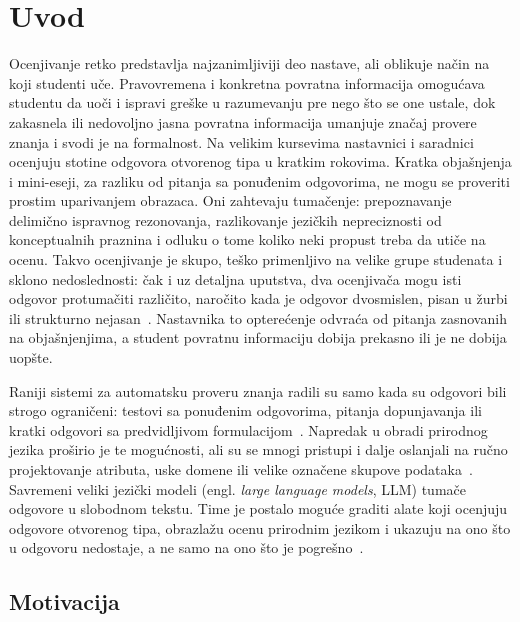 \chapter{Uvod}
\label{sec:uvod}

Ocenjivanje retko predstavlja najzanimljiviji deo nastave, ali oblikuje način na koji studenti uče.
Pravovremena i konkretna povratna informacija omogućava studentu da uoči i ispravi greške u razumevanju pre nego što se one ustale,
dok zakasnela ili nedovoljno jasna povratna informacija umanjuje značaj provere znanja i svodi je na formalnost.
Na velikim kursevima nastavnici i saradnici ocenjuju stotine odgovora otvorenog tipa u kratkim rokovima.
Kratka objašnjenja i mini-eseji, za razliku od pitanja sa ponuđenim odgovorima, ne mogu se proveriti prostim uparivanjem obrazaca.
Oni zahtevaju tumačenje: prepoznavanje delimično ispravnog rezonovanja,
razlikovanje jezičkih nepreciznosti od konceptualnih praznina i odluku o tome koliko neki propust treba da utiče na ocenu.
Takvo ocenjivanje je skupo, teško primenljivo na velike grupe studenata i sklono nedoslednosti:
čak i uz detaljna uputstva, dva ocenjivača mogu isti odgovor protumačiti različito,
naročito kada je odgovor dvosmislen, pisan u žurbi ili strukturno nejasan~\cite{brookhart2016century,jonsson2007use,stemler2004comparison}.
Nastavnika to opterećenje odvraća od pitanja zasnovanih na objašnjenjima,
a student povratnu informaciju dobija prekasno ili je ne dobija uopšte.

Raniji sistemi za automatsku proveru znanja radili su samo kada su odgovori bili strogo ograničeni:
testovi sa ponuđenim odgovorima,
pitanja dopunjavanja ili kratki odgovori sa predvidljivom formulacijom~\cite{brew2013automated,ramesh2022automated,shermis2003automated}.
Napredak u obradi prirodnog jezika proširio je te mogućnosti, ali su se mnogi pristupi i dalje oslanjali na ručno projektovanje atributa,
uske domene ili velike označene skupove podataka~\cite{banko2001scaling,collobert2008unified,sebastiani2002machine}.
Savremeni veliki jezički modeli (engl. \emph{large language models}, LLM) tumače odgovore u slobodnom tekstu.
Time je postalo moguće graditi alate koji ocenjuju odgovore otvorenog tipa, obrazlažu ocenu prirodnim jezikom
i ukazuju na ono što u odgovoru nedostaje, a ne samo na ono što je pogrešno~\cite{kasneci2023chatgpt,zhai2023chatgpt}.

\section{Motivacija}
\label{sec:motivacija}

